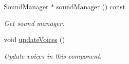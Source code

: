 \begin{Indent}
\begin{DoxyCompactItemize}
\mbox{\hyperlink{classrev_1_1_sound_manager}{Sound\+Manager}} $\ast$ \mbox{\hyperlink{classrev_1_1_audio_source_component_afdc0c33233ede66130f9fb70bcb12e53}{sound\+Manager}} () const
\begin{DoxyCompactList}\small\item\em Get sound manager. \end{DoxyCompactList}\item 
\mbox{\label{classrev_1_1_audio_source_component_afee8cce8778def7686f0eaebc25bc237}} 
void \mbox{\hyperlink{classrev_1_1_audio_source_component_afee8cce8778def7686f0eaebc25bc237}{update\+Voices}} ()
\begin{DoxyCompactList}\small\item\em Update voices in this component. \end{DoxyCompactList}\end{DoxyCompactItemize}
\end{Indent}
